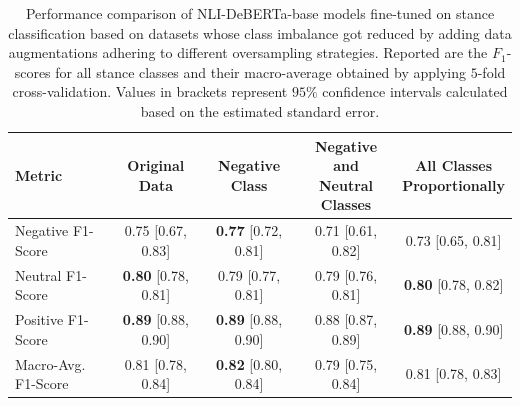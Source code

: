 \begin{table}[htbp]
\centering
\begin{tabular}{lcccc}
\toprule
Metric & Original Data & Negative Class & \makecell{Negative and\\Neutral Classes} & \makecell{All Classes\\Proportionally}\\
\midrule
Negative F1-Score & 0.75 [0.67, 0.83] & \textbf{0.77} [0.72, 0.81] & 0.71 [0.61, 0.82] & 0.73 [0.65, 0.81] \\
Neutral F1-Score & \textbf{0.80} [0.78, 0.81] & 0.79 [0.77, 0.81] & 0.79 [0.76, 0.81] & \textbf{0.80} [0.78, 0.82] \\
Positive F1-Score & \textbf{0.89} [0.88, 0.90] & \textbf{0.89} [0.88, 0.90] & 0.88 [0.87, 0.89] & \textbf{0.89} [0.88, 0.90] \\
Macro-Avg. F1-Score & 0.81 [0.78, 0.84] & \textbf{0.82} [0.80, 0.84] & 0.79 [0.75, 0.84] & 0.81 [0.78, 0.83] \\
\bottomrule
\end{tabular}
\caption[Comparison of augmentation-based oversampling strategies for stance classification]{Performance comparison of NLI-DeBERTa-base models fine-tuned on stance classification based on datasets whose class imbalance got reduced by adding data augmentations adhering to different oversampling strategies. Reported are the $F_1$-scores for all stance classes and their macro-average obtained by applying $5$-fold cross-validation. Values in brackets represent $95\%$ confidence intervals calculated based on the estimated standard error.}
\label{tab:augmentations_stance_classification}
\end{table}
